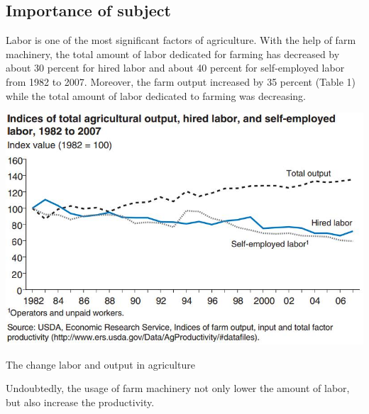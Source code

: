 \documentclass[12pt]{article}
\begin{document}
\begin{flushleft}
\subsection{Importance of subject}

Labor is one of the most significant factors of agriculture. With the help of farm machinery, the total amount of labor dedicated for farming has decreased by about 30 percent for hired labor and about 40 percent for self-employed labor from 1982 to 2007. Moreover, the farm output increased by 35 percent (Table 1) while the total amount of labor dedicated to farming was decreasing. \cite{o2011changing} %
\begin{table}[ht!]
	\begin{center}
		\includegraphics[scale = 0.7]{laborandoutput.jpg}
		\caption{The change labor and output in agriculture}
	\end{center}
\end{table}
Undoubtedly, the usage of farm machinery not only lower the amount of labor, but also increase the productivity. 


\end{flushleft}
\end{document}
